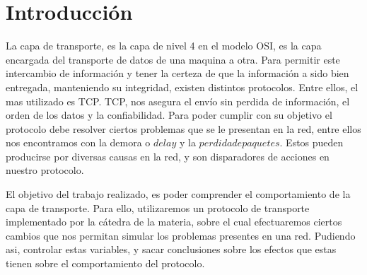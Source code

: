 \section{Introducci\'on}

La capa de transporte, es la capa de nivel 4 en el modelo OSI, es la capa encargada del transporte de datos de una maquina a otra. Para permitir este intercambio de informaci\'on y tener la certeza de que la informaci\'on a sido bien entregada, manteniendo su integridad, existen distintos protocolos. Entre ellos, el mas utilizado es TCP.
TCP, nos asegura el env\'io sin perdida de informaci\'on, el orden de los datos y la confiabilidad.
Para poder cumplir con su objetivo el protocolo debe resolver ciertos problemas que se le presentan en la red, entre ellos nos encontramos con la demora o $delay$ y la $perdida de paquetes$. Estos pueden producirse por diversas causas en la red, y son disparadores de acciones en nuestro protocolo.

El objetivo del trabajo realizado, es poder comprender el comportamiento de la capa de transporte. Para ello, utilizaremos un protocolo de transporte implementado por la c\'atedra de la materia, sobre el cual efectuaremos ciertos cambios que nos permitan simular los problemas presentes en una red. Pudiendo asi, controlar estas variables, y sacar conclusiones sobre los efectos que estas tienen sobre el comportamiento del protocolo.

